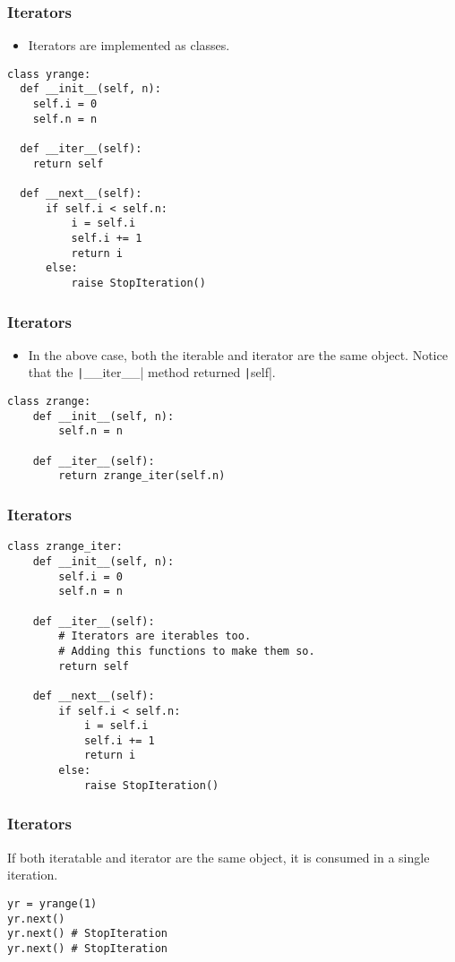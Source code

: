 \documentclass{../py-lecture}
\begin{document}
\begin{frame}[fragile]
	\frametitle{Iterators}
  \begin{itemize}
    \item Iterators are implemented as classes.
  \end{itemize}
  \begin{verbatim}
class yrange:
  def __init__(self, n):
    self.i = 0
    self.n = n

  def __iter__(self):
    return self

  def __next__(self):
      if self.i < self.n:
          i = self.i
          self.i += 1
          return i
      else:
          raise StopIteration()
    \end{verbatim}
\end{frame}

\begin{frame}[fragile]
	\frametitle{Iterators}
  \begin{itemize}
    \item In the above case, both the iterable and iterator are the same object. Notice that the \texttt|__iter__| method returned \texttt|self|.
  \end{itemize}
  \begin{verbatim}
class zrange:
    def __init__(self, n):
        self.n = n

    def __iter__(self):
        return zrange_iter(self.n)
  \end{verbatim}
\end{frame}

\begin{frame}[fragile]
	\frametitle{Iterators}
  \begin{verbatim}
class zrange_iter:
    def __init__(self, n):
        self.i = 0
        self.n = n

    def __iter__(self):
        # Iterators are iterables too.
        # Adding this functions to make them so.
        return self

    def __next__(self):
        if self.i < self.n:
            i = self.i
            self.i += 1
            return i
        else:
            raise StopIteration()
	\end{verbatim}
\end{frame}

\begin{frame}[fragile]
	\frametitle{Iterators}
  \begin{block}{}
		If both iteratable and iterator are the same object, it is consumed in a single iteration.
	\end{block}
  \begin{verbatim}
yr = yrange(1)
yr.next()
yr.next() # StopIteration
yr.next() # StopIteration
	\end{verbatim}
\end{frame}
\end{document}
